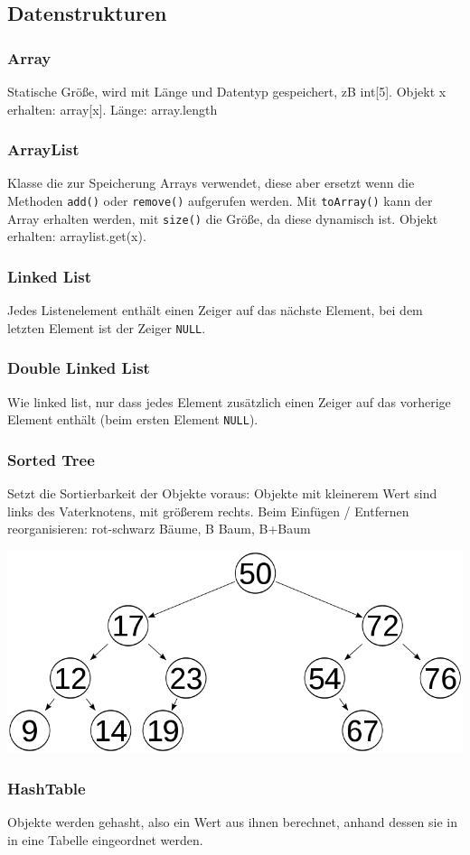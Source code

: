 \documentclass[12pt,a4]{article}
\begin{document}
	\subsection{Datenstrukturen}
	\subsubsection{Array}
	Statische Größe, wird mit Länge und Datentyp gespeichert, zB int[5]. Objekt x erhalten: array[x]. Länge: array.length
	\subsubsection{ArrayList}
	Klasse die zur Speicherung Arrays verwendet, diese aber ersetzt wenn die Methoden \texttt{add()} oder \texttt{remove()} aufgerufen werden. Mit \texttt{toArray()} kann der Array erhalten werden, mit \texttt{size()} die Größe, da diese dynamisch ist. Objekt erhalten: arraylist.get(x).
	\subsubsection{Linked List}
	Jedes Listenelement enthält einen Zeiger auf das nächste Element, bei dem letzten Element ist der Zeiger \texttt{NULL}.
	\subsubsection{Double Linked List}
	Wie linked list, nur dass jedes Element zusätzlich einen Zeiger auf das vorherige Element enthält (beim ersten Element \texttt{NULL}).
	\subsubsection{Sorted Tree}
	Setzt die Sortierbarkeit der Objekte voraus: Objekte mit kleinerem Wert sind links des Vaterknotens, mit größerem rechts. Beim Einfügen / Entfernen reorganisieren: rot-schwarz Bäume, B Baum, B+Baum
	\begin{center}
		\includegraphics[width=0.5\linewidth]{images/sortedtree}
	\end{center}
	\subsubsection{HashTable}
	Objekte werden gehasht, also ein Wert aus ihnen berechnet, anhand dessen sie in in eine Tabelle eingeordnet werden.
\end{document}
